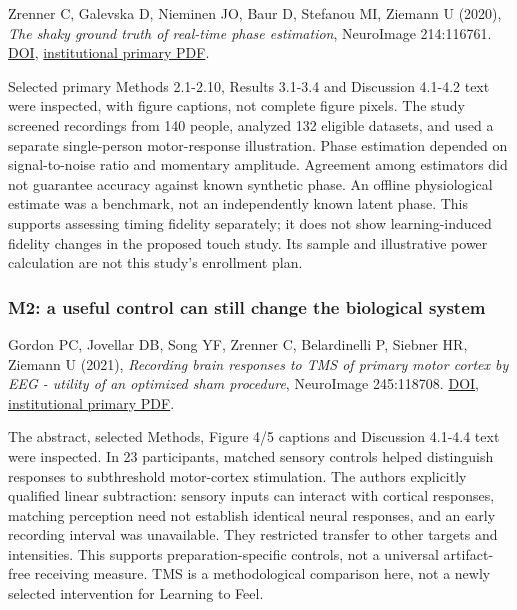 \documentclass[
  american,
  11pt,
  letterpaper,
]{article}
\begin{document}
Zrenner C, Galevska D, Nieminen JO, Baur D, Stefanou MI, Ziemann U (2020), \emph{The shaky ground truth of real-time phase estimation}, NeuroImage 214:116761. \href{https://doi.org/10.1016/j.neuroimage.2020.116761}{DOI}, \href{https://acris.aalto.fi/ws/portalfiles/portal/42216767/Zrenner_The_Shaky_Ground.1_s2.0_S1053811920302482_main.pdf}{institutional primary PDF}.

Selected primary Methods 2.1-2.10, Results 3.1-3.4 and Discussion 4.1-4.2 text were inspected, with figure captions, not complete figure pixels. The study screened recordings from 140 people, analyzed 132 eligible datasets, and used a separate single-person motor-response illustration. Phase estimation depended on signal-to-noise ratio and momentary amplitude. Agreement among estimators did not guarantee accuracy against known synthetic phase. An offline physiological estimate was a benchmark, not an independently known latent phase. This supports assessing timing fidelity separately; it does not show learning-induced fidelity changes in the proposed touch study. Its sample and illustrative power calculation are not this study's enrollment plan.

\subsubsection{M2: a useful control can still change the biological system}\label{m2-a-useful-control-can-still-change-the-biological-system}

Gordon PC, Jovellar DB, Song YF, Zrenner C, Belardinelli P, Siebner HR, Ziemann U (2021), \emph{Recording brain responses to TMS of primary motor cortex by EEG - utility of an optimized sham procedure}, NeuroImage 245:118708. \href{https://doi.org/10.1016/j.neuroimage.2021.118708}{DOI}, \href{https://iris.unitn.it/retrieve/handle/11572/325772/512900/Gordon_NI_2021.pdf}{institutional primary PDF}.

The abstract, selected Methods, Figure 4/5 captions and Discussion 4.1-4.4 text were inspected. In 23 participants, matched sensory controls helped distinguish responses to subthreshold motor-cortex stimulation. The authors explicitly qualified linear subtraction: sensory inputs can interact with cortical responses, matching perception need not establish identical neural responses, and an early recording interval was unavailable. They restricted transfer to other targets and intensities. This supports preparation-specific controls, not a universal artifact-free receiving measure. TMS is a methodological comparison here, not a newly selected intervention for Learning to Feel.
\end{document}
